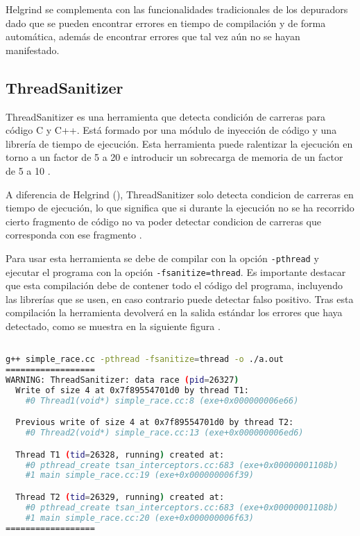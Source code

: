 Helgrind se complementa con las funcionalidades tradicionales de los \glspl{depurador} dado que se pueden encontrar errores en \gls{tiempo de compilación} y de forma automática, además de encontrar errores que tal vez aún no se hayan manifestado.

\subsection{ThreadSanitizer}{\label{subsec:thread-sanitizer}}

ThreadSanitizer es una herramienta que detecta \glspl{condición de carrera} para código C y C++. Está formado por una módulo de \gls{inyección de código} y una librería de \gls{tiempo de ejecución}. Esta herramienta puede ralentizar la ejecución en torno a un factor de 5 a 20 e introducir un sobrecarga de memoria de un factor de 5 a 10 \cite{ThreadSanitizer}.

A diferencia de Helgrind (), ThreadSanitizer solo detecta \glspl{condicion de carrera} en \gls{tiempo de ejecución}, lo que significa que si durante la ejecución no se ha recorrido cierto fragmento de código no va poder detectar \glspl{condicion de carrera} que corresponda con ese fragmento \cite{ThreadSanitizerGithub}.

Para usar esta herramienta se debe de compilar con la opción \texttt{-pthread} y ejecutar el programa con la opción \texttt{-fsanitize=thread}. Es importante destacar que esta \gls{compilación} debe de contener todo el código del programa, incluyendo las librerías que se usen, en caso contrario puede detectar \gls{falso positivo}. Tras esta \gls{compilación} la herramienta devolverá en la \gls{salida estándar} los errores que haya detectado, como se muestra en la siguiente figura \cite{ThreadSanitizer}.

\begin{lstlisting}[language=bash, caption={Muestra de salida de ThreadSanitizer al detectar un error de condición de carrera \cite{ThreadSanitizerGithub}}]

g++ simple_race.cc -pthread -fsanitize=thread -o ./a.out 
==================
WARNING: ThreadSanitizer: data race (pid=26327)
  Write of size 4 at 0x7f89554701d0 by thread T1:
    #0 Thread1(void*) simple_race.cc:8 (exe+0x000000006e66)

  Previous write of size 4 at 0x7f89554701d0 by thread T2:
    #0 Thread2(void*) simple_race.cc:13 (exe+0x000000006ed6)

  Thread T1 (tid=26328, running) created at:
    #0 pthread_create tsan_interceptors.cc:683 (exe+0x00000001108b)
    #1 main simple_race.cc:19 (exe+0x000000006f39)

  Thread T2 (tid=26329, running) created at:
    #0 pthread_create tsan_interceptors.cc:683 (exe+0x00000001108b)
    #1 main simple_race.cc:20 (exe+0x000000006f63)
==================

\end{lstlisting}

